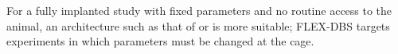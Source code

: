 For a fully implanted study with fixed parameters and no routine access to the animal, an architecture such as that of \citet{paulat2026} or \citet{plocksties2021} is more suitable; FLEX-DBS targets experiments in which parameters must be changed at the cage.
